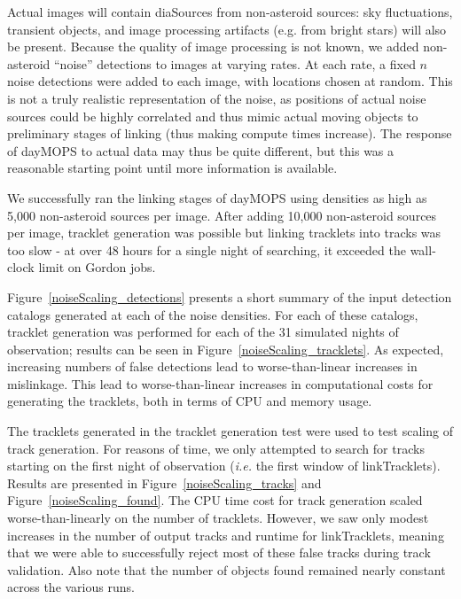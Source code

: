 Actual images will contain diaSources from non-asteroid sources:
sky fluctuations, transient objects, and image processing artifacts (e.g. from
bright stars) will also be present.  Because the quality of image
processing is not known, we added non-asteroid ``noise'' detections to
images at varying rates.  At each rate, a fixed $n$ noise detections
were added to each image, with locations chosen at random. This is not
a truly realistic representation of the noise, as positions of actual
noise sources could be highly correlated and thus mimic actual moving
objects to preliminary stages of linking (thus making compute times
increase). The response of dayMOPS to actual data may thus be quite
different, but this was a reasonable starting point until more
information is available. 

We successfully ran the linking stages of dayMOPS using densities as high as 5,000 non-asteroid
sources per image.  After adding 10,000 non-asteroid sources per
image, tracklet generation was possible but linking tracklets into
tracks was too slow - at over 48 hours for a single night of
searching, it exceeded the wall-clock limit on Gordon jobs.

Figure~\ref{noiseScaling_detections} presents a short summary of the input
detection catalogs generated at each of the noise densities.  For each
of these catalogs, tracklet generation was performed for each of the
31 simulated nights of observation; results can be seen in
Figure~\ref{noiseScaling_tracklets}.  As expected, increasing numbers
of false detections lead to worse-than-linear increases in mislinkage.
This lead to worse-than-linear increases in computational costs for generating the
tracklets, both in terms of CPU and memory usage.

The tracklets generated in the tracklet generation test were used to
test scaling of track generation.  For reasons of time, we only
attempted to search for tracks starting on the first night of
observation ({\it i.e.} the first window of linkTracklets).  Results are presented in
Figure~\ref{noiseScaling_tracks} and Figure~\ref{noiseScaling_found}.
The CPU time cost for track generation scaled worse-than-linearly on
the number of tracklets.  However, we saw only modest increases in the
number of output tracks and runtime for linkTracklets, meaning that we
were able to successfully reject most of these false tracks during
track validation.  Also note that
the number of objects found remained nearly constant across the
various runs.


